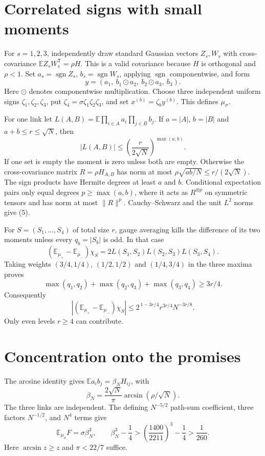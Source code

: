 \documentclass[11pt]{article}
\newcommand{\E}{\mathbb E}
\newcommand{\sgn}{\operatorname{sgn}}
\begin{document}
\section{Correlated signs with small moments}
For $s=1,2,3$, independently draw standard Gaussian vectors $Z_s,W_s$
with cross-covariance $\E Z_sW_s^{\mathsf T}=\rho H$.
This is a valid covariance because $H$ is orthogonal and $\rho<1$.
Set $a_s=\sgn Z_s$, $b_s=\sgn W_s$, applying $\sgn$ componentwise, and form
\[
 y=(a_1,\ b_1\odot a_2,\ b_2\odot a_3,\ b_3).
\]
Here $\odot$ denotes componentwise multiplication.
Choose three independent uniform signs $\zeta_1,\zeta_2,\zeta_3$,
put $\zeta_4=\sigma\zeta_1\zeta_2\zeta_3$, and set
$x^{(b)}=\zeta_b y^{(b)}$. This defines $\mu_\sigma$.

For one link let
$L(A,B)=\E\prod_{i\in A}a_i\prod_{j\in B}b_j$.
If $a=|A|$, $b=|B|$ and $a+b\le r\le\sqrt N$, then
\[
 |L(A,B)|\le\left(\frac{r}{2\sqrt N}\right)^{\max(a,b)}.
 \tag{5}
\]
If one set is empty the moment is zero unless both are empty.
Otherwise the cross-covariance matrix $R=\rho H_{A,B}$ has norm at most
$\rho\sqrt{ab/N}\le r/(2\sqrt N)$.
The sign products have Hermite degrees at least $a$ and $b$.
Conditional expectation pairs only equal degrees $p\ge\max(a,b)$,
where it acts as $R^{\otimes p}$ on symmetric tensors and has norm
at most $\|R\|^p$. Cauchy--Schwarz and the unit $L^2$ norms give (5).

For $S=(S_1,\ldots,S_4)$ of total size $r$, gauge averaging kills the
difference of its two moments unless every $q_b=|S_b|$ is odd.
In that case
\[
 (\E_{\mu_+}-\E_{\mu_-})\chi_S
       =2L(S_1,S_2)L(S_2,S_3)L(S_3,S_4).
\]
Taking weights $(3/4,1/4)$, $(1/2,1/2)$ and $(1/4,3/4)$ in the
three maxima proves
\[
 \max(q_1,q_2)+\max(q_2,q_3)+\max(q_3,q_4)\ge3r/4.
\]
Consequently
\[
 |(\E_{\mu_+}-\E_{\mu_-})\chi_S|
 \le 2^{\,1-3r/4}r^{3r/4}N^{-3r/8}.
 \tag{6}
\]
Only even levels $r\ge4$ can contribute.

\section{Concentration onto the promises}
The arcsine identity gives $\E a_i b_j=\beta_NH_{ij}$, with
\[
 \beta_N=\frac{2\sqrt N}{\pi}\arcsin(\rho/\sqrt N).
\]
The three links are independent. The defining $N^{-5/2}$ path-sum
coefficient, three factors $N^{-1/2}$, and $N^4$ terms give
\[
 \E_{\mu_\sigma}F=\sigma\beta_N^3,\qquad
 \beta_N^3-\frac14>
 \left(\frac{1400}{2211}\right)^3-\frac14>\frac1{260}.
 \tag{7}
\]
Here $\arcsin z\ge z$ and $\pi<22/7$ suffice.
\end{document}
